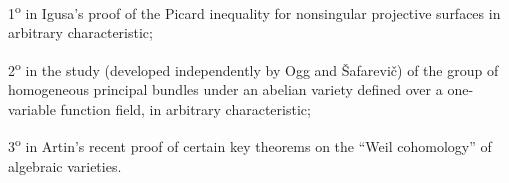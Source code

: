 1\textsuperscript{o} in Igusa's proof of the Picard inequality for
nonsingular projective surfaces in arbitrary characteristic;

2\textsuperscript{o} in the study (developed independently by Ogg and
Šafarevič) of the group of homogeneous principal bundles under an abelian
variety defined over a one-variable function field, in arbitrary
characteristic;

3\textsuperscript{o} in Artin's recent proof of certain key theorems on the
“Weil cohomology” of algebraic varieties.
